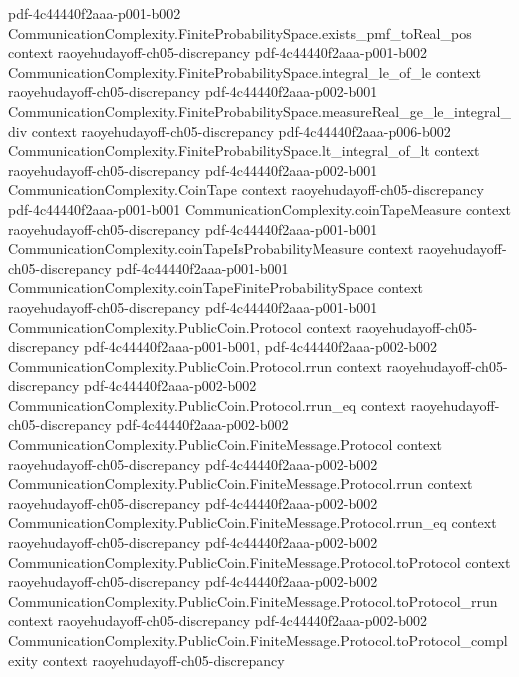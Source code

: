 \begin{theorem}
  {pdf-4c44440f2aaa-p001-b002}
\proofstep
  {CommunicationComplexity.FiniteProbabilitySpace.exists_pmf_toReal_pos}
  {context}
  {raoyehudayoff-ch05-discrepancy}
  {pdf-4c44440f2aaa-p001-b002}
\proofstep
  {CommunicationComplexity.FiniteProbabilitySpace.integral_le_of_le}
  {context}
  {raoyehudayoff-ch05-discrepancy}
  {pdf-4c44440f2aaa-p002-b001}
\proofstep
  {CommunicationComplexity.FiniteProbabilitySpace.measureReal_ge_le_integral_div}
  {context}
  {raoyehudayoff-ch05-discrepancy}
  {pdf-4c44440f2aaa-p006-b002}
\proofstep
  {CommunicationComplexity.FiniteProbabilitySpace.lt_integral_of_lt}
  {context}
  {raoyehudayoff-ch05-discrepancy}
  {pdf-4c44440f2aaa-p002-b001}
\proofstep
  {CommunicationComplexity.CoinTape}
  {context}
  {raoyehudayoff-ch05-discrepancy}
  {pdf-4c44440f2aaa-p001-b001}
\proofstep
  {CommunicationComplexity.coinTapeMeasure}
  {context}
  {raoyehudayoff-ch05-discrepancy}
  {pdf-4c44440f2aaa-p001-b001}
\proofstep
  {CommunicationComplexity.coinTapeIsProbabilityMeasure}
  {context}
  {raoyehudayoff-ch05-discrepancy}
  {pdf-4c44440f2aaa-p001-b001}
\proofstep
  {CommunicationComplexity.coinTapeFiniteProbabilitySpace}
  {context}
  {raoyehudayoff-ch05-discrepancy}
  {pdf-4c44440f2aaa-p001-b001}
\proofstep
  {CommunicationComplexity.PublicCoin.Protocol}
  {context}
  {raoyehudayoff-ch05-discrepancy}
  {pdf-4c44440f2aaa-p001-b001,
    pdf-4c44440f2aaa-p002-b002}
\proofstep
  {CommunicationComplexity.PublicCoin.Protocol.rrun}
  {context}
  {raoyehudayoff-ch05-discrepancy}
  {pdf-4c44440f2aaa-p002-b002}
\proofstep
  {CommunicationComplexity.PublicCoin.Protocol.rrun_eq}
  {context}
  {raoyehudayoff-ch05-discrepancy}
  {pdf-4c44440f2aaa-p002-b002}
\proofstep
  {CommunicationComplexity.PublicCoin.FiniteMessage.Protocol}
  {context}
  {raoyehudayoff-ch05-discrepancy}
  {pdf-4c44440f2aaa-p002-b002}
\proofstep
  {CommunicationComplexity.PublicCoin.FiniteMessage.Protocol.rrun}
  {context}
  {raoyehudayoff-ch05-discrepancy}
  {pdf-4c44440f2aaa-p002-b002}
\proofstep
  {CommunicationComplexity.PublicCoin.FiniteMessage.Protocol.rrun_eq}
  {context}
  {raoyehudayoff-ch05-discrepancy}
  {pdf-4c44440f2aaa-p002-b002}
\proofstep
  {CommunicationComplexity.PublicCoin.FiniteMessage.Protocol.toProtocol}
  {context}
  {raoyehudayoff-ch05-discrepancy}
  {pdf-4c44440f2aaa-p002-b002}
\proofstep
  {CommunicationComplexity.PublicCoin.FiniteMessage.Protocol.toProtocol_rrun}
  {context}
  {raoyehudayoff-ch05-discrepancy}
  {pdf-4c44440f2aaa-p002-b002}
\proofstep
  {CommunicationComplexity.PublicCoin.FiniteMessage.Protocol.toProtocol_complexity}
  {context}
  {raoyehudayoff-ch05-discrepancy}

\end{theorem}
